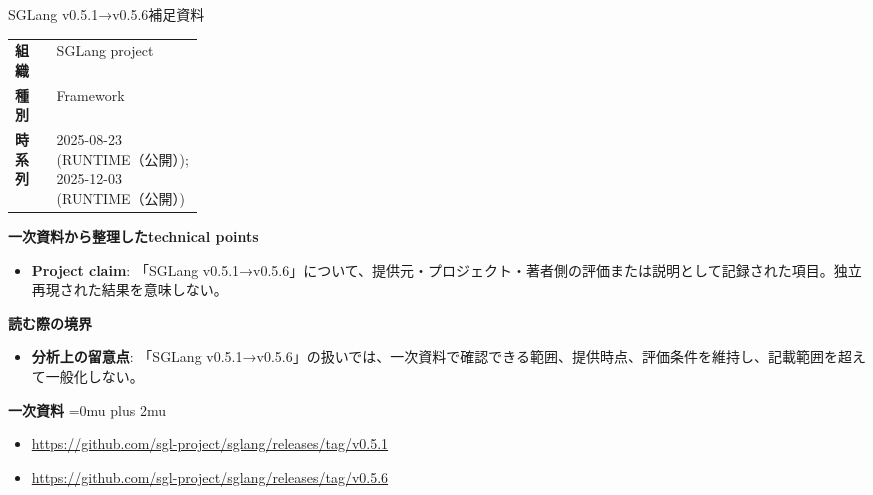 \begin{technicalnote}{SGLang v0.5.1→v0.5.6}{補足資料}
\begingroup
\begin{tabularx}{\linewidth}{@{}>{\bfseries}p{0.22\linewidth}X@{}}
組織 & SGLang project \\
種別 & Framework \\
時系列 & 2025-08-23 (RUNTIME（公開）); 2025-12-03 (RUNTIME（公開）) \\
\end{tabularx}
\smallskip
{\bfseries 一次資料から整理したtechnical points}
\begin{itemize}[leftmargin=1.5em,itemsep=0.35em]
\item \textbf{Project claim}: 「SGLang v0.5.1→v0.5.6」について、提供元・プロジェクト・著者側の評価または説明として記録された項目。独立再現された結果を意味しない。
\end{itemize}
\begin{minipage}{\linewidth}
{\bfseries 読む際の境界}
\begin{itemize}[leftmargin=1.5em,itemsep=0.35em]
\item \textbf{分析上の留意点}: 「SGLang v0.5.1→v0.5.6」の扱いでは、一次資料で確認できる範囲、提供時点、評価条件を維持し、記載範囲を超えて一般化しない。
\end{itemize}
\begin{samepage}
{\bfseries 一次資料}
\begingroup\sloppy
\Urlmuskip=0mu plus 2mu\relax
\begin{itemize}[leftmargin=1.5em,itemsep=0.25em]
\item {\scriptsize\url{https://github.com/sgl-project/sglang/releases/tag/v0.5.1}}
\item {\scriptsize\url{https://github.com/sgl-project/sglang/releases/tag/v0.5.6}}
\end{itemize}
\endgroup
\end{samepage}
\end{minipage}
\endgroup
\end{technicalnote}
\medskip

